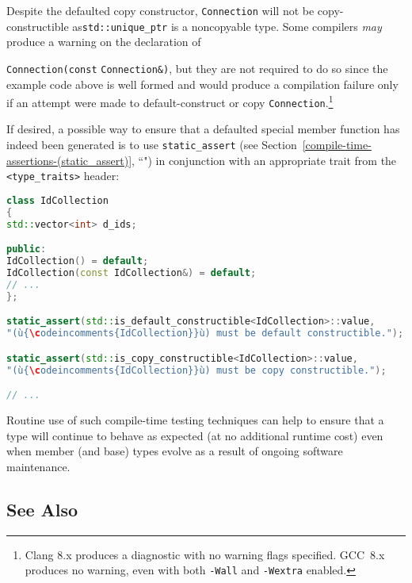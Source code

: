 \noindent Despite the defaulted copy constructor, \texttt{Connection} will not be
copy-constructible as\linebreak[4] \texttt{std::unique\_ptr} is a noncopyable type.
Some compilers \emph{may} produce a warning on the declaration of
{\texttt{Connection(const} \texttt{Connection\&)}, but they are not
required to do so since the example code above is well formed and would produce a
compilation failure only if an attempt were made to default-construct or
copy \texttt{Connection}.{\cprotect\footnote{Clang 8.x
produces a diagnostic with no warning flags specified.
GCC~8.x produces no warning, even with both
\texttt{-Wall} and \texttt{-Wextra} enabled.}}

If desired, a possible way to ensure that a defaulted special member
function has indeed been generated is to use
{\texttt{static\_assert}} (see Section~\ref{compile-time-assertions-(static_assert)}, ``")
in conjunction with an
appropriate trait from the \texttt{<type\_traits>} header:

\begin{lstlisting}[language=C++]
class IdCollection
{
std::vector<int> d_ids;

public:
IdCollection() = default;
IdCollection(const IdCollection&) = default;
// ...
};

static_assert(std::is_default_constructible<IdCollection>::value,
"(ù{\codeincomments{IdCollection}}ù) must be default constructible.");

static_assert(std::is_copy_constructible<IdCollection>::value,
"(ù{\codeincomments{IdCollection}}ù) must be copy constructible.");

// ...
\end{lstlisting}

\noindent Routine use of such compile-time testing techniques can help to ensure
that a type will continue to behave as expected (at no additional
runtime cost) even when member (and base) types evolve as a result
of ongoing software maintenance.

\subsection[See Also]{See Also}\label{see-also}

}
